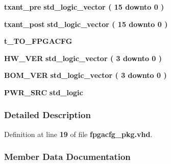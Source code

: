 \begin{DoxyCompactItemize}
\item 
{\bf txant\+\_\+pre} {\bfseries {\bfseries \textcolor{comment}{std\+\_\+logic\+\_\+vector}\textcolor{vhdlchar}{ }\textcolor{vhdlchar}{(}\textcolor{vhdlchar}{ }\textcolor{vhdlchar}{ } \textcolor{vhdldigit}{15} \textcolor{vhdlchar}{ }\textcolor{keywordflow}{downto}\textcolor{vhdlchar}{ }\textcolor{vhdlchar}{ } \textcolor{vhdldigit}{0} \textcolor{vhdlchar}{ }\textcolor{vhdlchar}{)}\textcolor{vhdlchar}{ }}} 
\item 
{\bf txant\+\_\+post} {\bfseries {\bfseries \textcolor{comment}{std\+\_\+logic\+\_\+vector}\textcolor{vhdlchar}{ }\textcolor{vhdlchar}{(}\textcolor{vhdlchar}{ }\textcolor{vhdlchar}{ } \textcolor{vhdldigit}{15} \textcolor{vhdlchar}{ }\textcolor{keywordflow}{downto}\textcolor{vhdlchar}{ }\textcolor{vhdlchar}{ } \textcolor{vhdldigit}{0} \textcolor{vhdlchar}{ }\textcolor{vhdlchar}{)}\textcolor{vhdlchar}{ }}} 
\item 
{\bf t\+\_\+\+T\+O\+\_\+\+F\+P\+G\+A\+C\+FG} {\bfseries  }
\item 
{\bf H\+W\+\_\+\+V\+ER} {\bfseries {\bfseries \textcolor{comment}{std\+\_\+logic\+\_\+vector}\textcolor{vhdlchar}{ }\textcolor{vhdlchar}{(}\textcolor{vhdlchar}{ }\textcolor{vhdlchar}{ } \textcolor{vhdldigit}{3} \textcolor{vhdlchar}{ }\textcolor{keywordflow}{downto}\textcolor{vhdlchar}{ }\textcolor{vhdlchar}{ } \textcolor{vhdldigit}{0} \textcolor{vhdlchar}{ }\textcolor{vhdlchar}{)}\textcolor{vhdlchar}{ }}} 
\item 
{\bf B\+O\+M\+\_\+\+V\+ER} {\bfseries {\bfseries \textcolor{comment}{std\+\_\+logic\+\_\+vector}\textcolor{vhdlchar}{ }\textcolor{vhdlchar}{(}\textcolor{vhdlchar}{ }\textcolor{vhdlchar}{ } \textcolor{vhdldigit}{3} \textcolor{vhdlchar}{ }\textcolor{keywordflow}{downto}\textcolor{vhdlchar}{ }\textcolor{vhdlchar}{ } \textcolor{vhdldigit}{0} \textcolor{vhdlchar}{ }\textcolor{vhdlchar}{)}\textcolor{vhdlchar}{ }}} 
\item 
{\bf P\+W\+R\+\_\+\+S\+RC} {\bfseries {\bfseries \textcolor{comment}{std\+\_\+logic}\textcolor{vhdlchar}{ }}} 
\end{DoxyCompactItemize}


\subsubsection{Detailed Description}


Definition at line {\bf 19} of file {\bf fpgacfg\+\_\+pkg.\+vhd}.



\subsubsection{Member Data Documentation}
